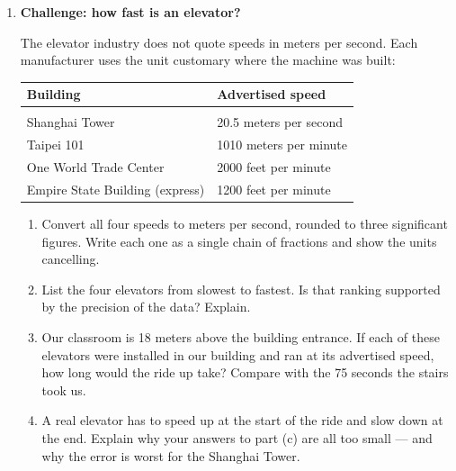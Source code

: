 \documentclass[12pt, twoside]{article}
\begin{document}
\begin{enumerate}[itemsep=0.7cm]
\newpage

\item \textbf{Challenge: how fast is an elevator?}

  The elevator industry does not quote speeds in meters per second. Each
  manufacturer uses the unit customary where the machine was built:

  \begin{center}
  \begin{tabular}{l l}
    \textbf{Building} & \textbf{Advertised speed} \\[0.12cm]
    \hline \\[-0.28cm]
    Shanghai Tower & 20.5 meters per second \\[0.1cm]
    Taipei 101 & 1010 meters per minute \\[0.1cm]
    One World Trade Center & 2000 feet per minute \\[0.1cm]
    Empire State Building (express) & 1200 feet per minute \\
  \end{tabular}
  \end{center}

  \vspace{0.15cm}

  \begin{enumerate}[itemsep=0.35cm]
    \item Convert all four speeds to meters per second, rounded to three
      significant figures. Write each one as a single chain of fractions and show
      the units cancelling. \vspace{4.0cm}

    \item List the four elevators from slowest to fastest. Is that ranking
      supported by the precision of the data? Explain. \vspace{1.7cm}

    \item Our classroom is 18 meters above the building entrance. If each of these
      elevators were installed in our building and ran at its advertised speed, how
      long would the ride up take? Compare with the 75 seconds the stairs took us. \vspace{2.1cm}

    \item A real elevator has to speed up at the start of the ride and slow down at
      the end. Explain why your answers to part (c) are all too small --- and why
      the error is worst for the Shanghai Tower.
  \end{enumerate}

\end{enumerate}
\end{document}
